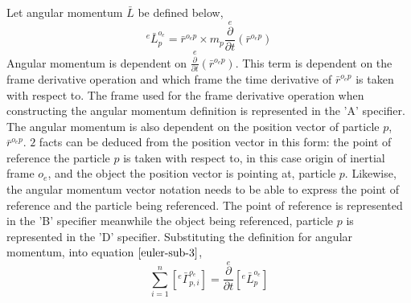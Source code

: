 Let angular momentum $\bar{L}$ be defined below,
\begin{equation}
{}^{e}\bar{L}^{o_{e}}_{p} = \bar{r}^{o_{e}p}\times m_{p}\overset{e}{\frac{\partial}{\partial t}}\left(\bar{r}^{o_{e}p}\right)
\label{Angular Momentum Definition for Point Particles}
\end{equation}
Angular momentum is dependent on $\displaystyle \overset{e}{\frac{\partial}{\partial t}}\left(\bar{r}^{o_{e}p}\right)$. 
This term is dependent on the frame derivative operation and which frame the time derivative of $\displaystyle \bar{r}^{o_{e}p}$ is taken with respect to. 
The frame used for the frame derivative operation when constructing the angular momentum definition is represented in the 'A' specifier. 
The angular momentum is also dependent on the position vector of particle $p$, $\displaystyle \bar{r}^{o_{e}p}$. 
$2$ facts can be deduced from the position vector in this form: the point of reference the particle $p$ is taken with respect to, in this case origin of inertial frame $o_{e}$, and the object the position vector is pointing at, particle $p$. 
Likewise, the angular momentum vector notation needs to be able to express the point of reference and the particle being referenced. 
The point of reference is represented in the 'B' specifier meanwhile the object being referenced, particle $p$ is represented in the 'D' specifier. 
Substituting the definition for angular momentum, into equation $\ref{euler-sub-3}$,
\begin{equation}
\sum^{n}_{i = 1}\left[{}^{e}\bar{\Gamma}^{o_{e}}_{p,i}\right] = \overset{e}{\frac{\partial}{\partial t}}\left[{}^{e}\bar{L}^{o_{e}}_{p}\right]
\label{Eulers Law Point Particle Inertial Reference Frame}
\end{equation}
